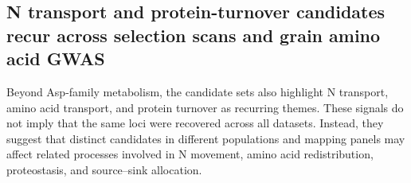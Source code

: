 



\subsection{N transport and protein-turnover candidates recur across selection scans and grain amino acid GWAS}

Beyond Asp-family metabolism, the candidate sets also highlight N transport, amino acid transport, and protein turnover as recurring themes. These signals do not imply that the same loci were recovered across all datasets. Instead, they suggest that distinct candidates in different populations and mapping panels may affect related processes involved in N movement, amino acid redistribution, proteostasis, and source--sink allocation.

